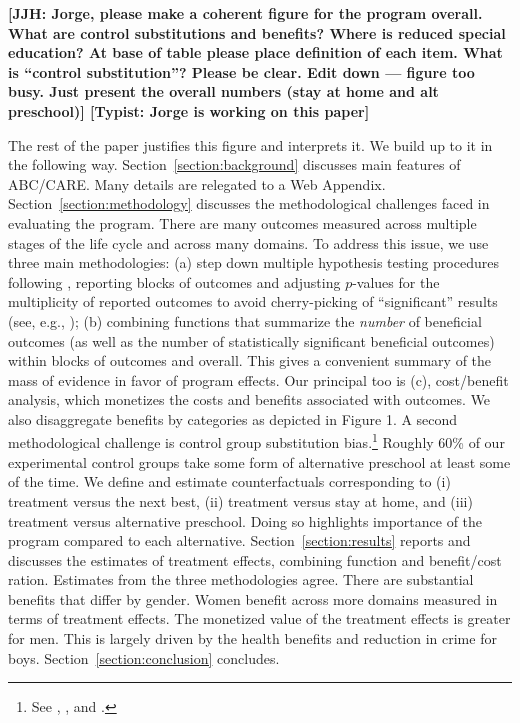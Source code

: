 \textbf{[JJH: Jorge, please make a coherent figure for the program overall. What are control substitutions and benefits? Where is reduced special education? At base of table please place definition of each item. What is ``control substitution''? Please be clear. Edit down --- figure too busy. Just present the overall numbers (stay at home and alt preschool)] [Typist: Jorge is working on this paper]}

The rest of the paper justifies this figure and interprets it. We build up to it in the following way. Section~\ref{section:background} discusses main features of ABC/CARE. Many details are relegated to a Web Appendix. Section~\ref{section:methodology} discusses the methodological challenges faced in evaluating the program. There are many outcomes measured across multiple stages of the life cycle and across many domains. To address this issue, we use three main methodologies: (a) step down multiple hypothesis testing procedures following \cite{Romano_Wolf_2005_JASA}, reporting blocks of outcomes and adjusting $p$-values for the multiplicity of reported outcomes to avoid cherry-picking of ``significant'' results (see, e.g., \citealp{Heckman_Moon_etal_2010_QE}); (b) combining functions that summarize the \emph{number} of beneficial outcomes (as well as the number of statistically significant beneficial outcomes) within blocks of outcomes and overall. This gives a convenient summary of the mass of evidence in favor of program effects. Our principal too is (c), cost/benefit analysis, which monetizes the costs and benefits associated with outcomes. We also disaggregate benefits by categories as depicted in Figure 1. A second methodological challenge is control group substitution bias.\footnote{See \cite{Heckman_1992_randomization}, \cite{Heckman_Hohmann_etal_2000_QJE}, and \cite{Kline-Walters_2016_QJE}.} Roughly 60\% of our experimental control groups take some form of alternative preschool at least some of the time. We define and estimate counterfactuals corresponding to (i) treatment versus the next best, (ii) treatment versus stay at home, and (iii) treatment versus alternative preschool. Doing so highlights importance of the program compared to each alternative. Section~\ref{section:results} reports and discusses the estimates of treatment effects, combining function and benefit/cost ration. Estimates from the three methodologies agree. There are substantial benefits that differ by gender. Women benefit across more domains measured in terms of treatment effects. The monetized value of the treatment effects is greater for men. This is largely driven by the health benefits and reduction in crime for boys. Section~\ref{section:conclusion} concludes.

